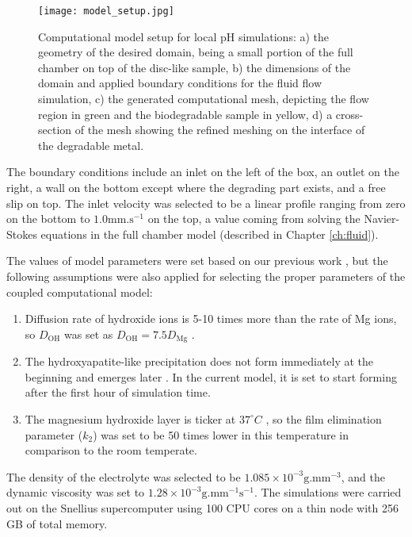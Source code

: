 \begin{figure}[h]
\centering
\medskip
\texttt{[image: model\_setup.jpg]}
\caption[Computational model setup for local pH simulations]{Computational model setup for local pH simulations: a) the geometry of the desired domain, being a small portion of the full chamber on top of the disc-like sample, b) the dimensions of the domain and applied boundary conditions for the fluid flow simulation, c) the generated computational mesh, depicting the flow region in green and the biodegradable sample in yellow, d) a cross-section of the mesh showing the refined meshing on the interface of the degradable metal.} \label{fig:kinetics_model_setup}
\end{figure}

The boundary conditions include an inlet on the left of the box, an outlet on the right, a wall on the bottom except where the degrading part exists, and a free slip on top. The inlet velocity was selected to be a linear profile ranging from zero on the bottom to $1.0 \text{mm.s}^{-1}$ on the top, a value coming from solving the Navier-Stokes equations in the full chamber model (described in Chapter \ref{ch:fluid}).

The values of model parameters were set based on our previous work \cite{Barzegari2021}, but the following assumptions were also applied for selecting the proper parameters of the coupled computational model:
\begin{enumerate}
\item
Diffusion rate of hydroxide ions is 5-10 times more than the rate of Mg ions, so $D_{\mathrm{OH}}$ was set as $D_{\mathrm{OH}} = 7.5 D_{\mathrm{Mg}}$ \cite{Gonzalez2021}.
\item
The hydroxyapatite-like precipitation does not form immediately at the beginning and emerges later \cite{Gonzalez2021,Wang2022}. In the current model, it is set to start forming after the first hour of simulation time.
\item
The magnesium hydroxide layer is ticker at $37^{\circ}C$ \cite{Wang2022}, so the film elimination parameter ($k_2$) was set to be 50 times lower in this temperature in comparison to the room temperate.
\end{enumerate}

The density of the electrolyte was selected to be $1.085\times10^{-3} \text{g.mm}^{-3}$, and the dynamic viscosity was set to $1.28\times10^{-3} \text{g.mm}^{-1}\text{s}^{-1}$. The simulations were carried out on the Snellius supercomputer using 100 \gls{CPU} cores on a thin node with 256 GB of total memory.


